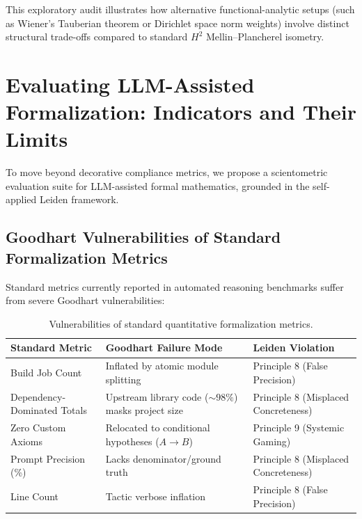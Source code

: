 \documentclass[11pt,a4paper]{article}
\theoremstyle{definition}
\theoremstyle{remark}
\begin{document}
This exploratory audit illustrates how alternative functional-analytic setups (such as Wiener's Tauberian theorem or Dirichlet space norm weights) involve distinct structural trade-offs compared to standard $H^2$ Mellin--Plancherel isometry.

\section{Evaluating LLM-Assisted Formalization: Indicators and Their Limits}
\label{sec:indicators}

To move beyond decorative compliance metrics, we propose a scientometric evaluation suite for LLM-assisted formal mathematics, grounded in the self-applied Leiden framework.

\subsection{Goodhart Vulnerabilities of Standard Formalization Metrics}

Standard metrics currently reported in automated reasoning benchmarks suffer from severe Goodhart vulnerabilities:

\begin{table}[htbp]
\centering
\small
\begin{tabular}{lll}
\toprule
\textbf{Standard Metric} & \textbf{Goodhart Failure Mode} & \textbf{Leiden Violation} \\
\midrule
Build Job Count & Inflated by atomic module splitting & Principle 8 (False Precision) \\
Dependency-Dominated Totals & Upstream library code ($\sim 98\%$) masks project size & Principle 8 (Misplaced Concreteness) \\
Zero Custom Axioms & Relocated to conditional hypotheses ($A \to B$) & Principle 9 (Systemic Gaming) \\
Prompt Precision (\%) & Lacks denominator/ground truth & Principle 8 (Misplaced Concreteness) \\
Line Count & Tactic verbose inflation & Principle 8 (False Precision) \\
\bottomrule
\end{tabular}
\caption{Vulnerabilities of standard quantitative formalization metrics.}
\label{tab:metric_vulnerabilities}
\end{table}
\end{document}
